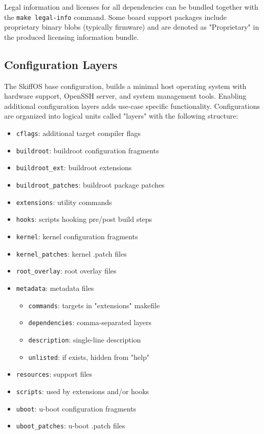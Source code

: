 \documentclass[english,]{IEEEtran}
\providecommand{\tightlist}{%
  \setlength{\itemsep}{0pt}\setlength{\parskip}{0pt}}
\begin{document}
Legal information and licenses for all dependencies can be bundled
together with the \texttt{make\ legal-info} command. Some board support
packages include proprietary binary blobs (typically firmware) and are
denoted as "Proprietary" in the produced licensing information bundle.

\hypertarget{configuration-layers}{%
\subsection{Configuration Layers}\label{configuration-layers}}

The SkiffOS base configuration, builds a minimal host operating system
with hardware support, OpenSSH server, and system management tools.
Enabling additional configuration layers adds use-case specific
functionality. Configurations are organized into logical units called
"layers" with the following structure:

\begin{itemize}
\tightlist
\item
  \texttt{cflags}: additional target compiler flags
\item
  \texttt{buildroot}: buildroot configuration fragments
\item
  \texttt{buildroot\_ext}: buildroot extensions
\item
  \texttt{buildroot\_patches}: buildroot package patches
\item
  \texttt{extensions}: utility commands
\item
  \texttt{hooks}: scripts hooking pre/post build steps
\item
  \texttt{kernel}: kernel configuration fragments
\item
  \texttt{kernel\_patches}: kernel .patch files
\item
  \texttt{root\_overlay}: root overlay files
\item
  \texttt{metadata}: metadata files

  \begin{itemize}
  \tightlist
  \item
    \texttt{commands}: targets in "extensions" makefile
  \item
    \texttt{dependencies}: comma-separated layers
  \item
    \texttt{description}: single-line description
  \item
    \texttt{unlisted}: if exists, hidden from "help"
  \end{itemize}
\item
  \texttt{resources}: support files
\item
  \texttt{scripts}: used by extensions and/or hooks
\item
  \texttt{uboot}: u-boot configuration fragments
\item
  \texttt{uboot\_patches}: u-boot .patch files
\end{itemize}
\end{document}
